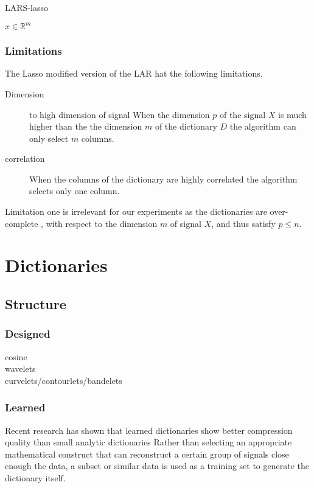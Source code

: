 \begin{algorithm}
\caption{LARS-lasso}
\begin{algorithmic}[1]
\REQUIRE $x \in \mathbb{R}^m$
\end{algorithmic}
\end{algorithm}

\subsubsection*{Limitations}
The Lasso modified version of the LAR hat the following limitations.
\begin{description}
 \item[Dimension] to high dimension of signal When the dimension $p$ of the signal $X$ is 
much higher than the the dimension $m$ of the dictionary $D$ the algorithm can only select $m$ columns.

\item[correlation] When the columns of the dictionary are highly correlated the algorithm
selects only one column.
\end{description}

Limitation one is irrelevant for our experiments as the dictionaries are over-complete 
, with respect to the dimension $m$ of signal $X$, and thus satisfy $p\leq n$.





\section{Dictionaries}
\subsection{Structure}
\subsubsection*{Designed}
\begin{description}
 \item[cosine]
 \item[wavelets]
 \item[curvelets/contourlets/bandelets]
\end{description}

\subsubsection*{Learned}
Recent research has shown that learned dictionaries show better compression quality than small analytic dictionaries \cite{Aharon2006} \cite{Chen1998} 
Rather than selecting an appropriate mathematical construct that can reconstruct a certain group of signals close enough the data, a subset or similar data
is used as a training set to generate the dictionary itself.


